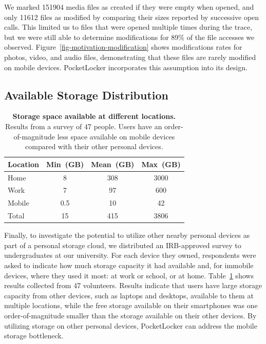 We marked \num{151904} media files as created if they were empty when opened,
and only \num{11612} files as modified by comparing their sizes reported by
successive open calls. This limited us to files that were opened multiple
times during the trace, but we were still able to determine modifications for
89\% of the file accesses we observed.
Figure~\ref{fig-motivation-modification} shows modifications rates for
photos, video, and audio files, demonstrating that these files are rarely
modified on mobile devices. PocketLocker incorporates this assumption into
its design.

\subsection{Available Storage Distribution}

\begin{table}[t]
{\small
\begin{tabularx}{\textwidth}{Xccc}

\textbf{Location} & \textbf{Min~(GB)} & \textbf{Mean~(GB)} &
\textbf{Max~(GB)} \\ \toprule
Home & 8 & 308 & 3000 \\
Work & 7 & 97 & 600 \\
Mobile & 0.5 & 10 & 42 \\
Total & 15 & 415 & 3806 \\

\end{tabularx}
}

\caption{\small \textbf{Storage space available at different locations.}
Results from a survey of 47 people. Users have an order-of-magnitude less
space available on mobile devices compared with their other personal
devices.}

\label{table-storagesurvey}

\end{table}

Finally, to investigate the potential to utilize other nearby personal
devices as part of a personal storage cloud, we distributed an IRB-approved
survey to undergraduates at our university. For each device they owned,
respondents were asked to indicate how much storage capacity it had available
and, for immobile devices, where they used it most: at work or school, or at
home. Table~\ref{table-storagesurvey} shows results collected from 47
volunteers. Results indicate that users have large storage capacity from
other devices, such as laptops and desktops, available to them at multiple
locations, while the free storage available on their smartphones was one
order-of-magnitude smaller than the storage available on their other devices.
By utilizing storage on other personal devices, PocketLocker can address the
mobile storage bottleneck.
